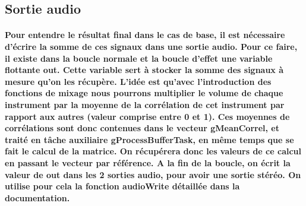 \documentclass[a4paper]{article}
\begin{document}
\subsection{Sortie audio} \paragraph{Pour entendre le résultat final dans le cas
de base, il est nécessaire d’écrire la somme de ces signaux dans une sortie
audio. Pour ce faire, il existe dans la boucle normale et la boucle d’effet une
variable flottante out. Cette variable sert à stocker la somme des signaux à
mesure qu’on les récupère. L'idée est qu'avec l'introduction des fonctions de
mixage nous pourrons multiplier le volume de chaque instrument par la moyenne de
la corrélation de cet instrument par rapport aux autres (valeur comprise entre 0
et 1). Ces moyennes de corrélations sont donc contenues dans le vecteur
gMeanCorrel, et traité en tâche auxiliaire gProcessBufferTask, en même temps que
se fait le calcul de la matrice. On récupérera donc les valeurs de ce calcul en
passant le vecteur par référence. A la fin de la boucle, on écrit la valeur de
out dans les 2 sorties audio, pour avoir une sortie stéréo. On utilise pour cela
la fonction audioWrite détaillée dans la documentation.}
\end{document}
